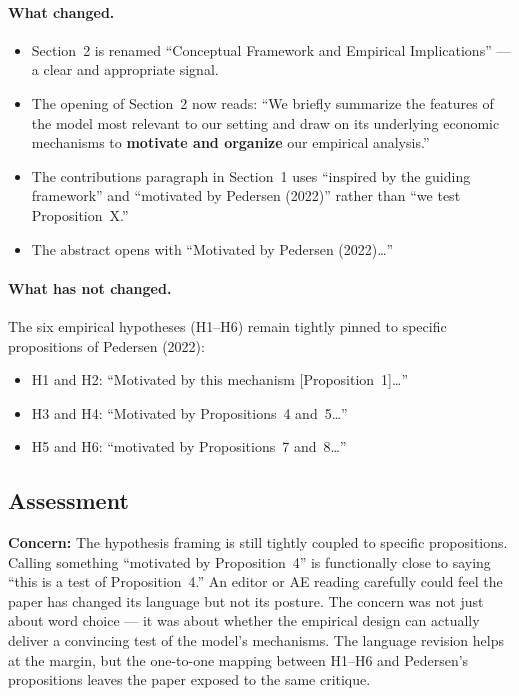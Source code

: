 \documentclass[11pt]{article}
\newcommand{\concern}[1]{\textcolor{concern}{\textbf{Concern:} #1}}
\begin{document}
\paragraph{What changed.}
\begin{itemize}
  \item Section~2 is renamed ``Conceptual Framework and Empirical
    Implications'' --- a clear and appropriate signal.
  \item The opening of Section~2 now reads: ``We briefly summarize the
    features of the model most relevant to our setting and draw on its
    underlying economic mechanisms to \textbf{motivate and organize} our
    empirical analysis.''
  \item The contributions paragraph in Section~1 uses ``inspired by the
    guiding framework'' and ``motivated by Pedersen (2022)'' rather than
    ``we test Proposition~X.''
  \item The abstract opens with ``Motivated by Pedersen (2022)\ldots''
\end{itemize}

\paragraph{What has not changed.}
The six empirical hypotheses (H1--H6) remain tightly pinned to specific
propositions of Pedersen (2022):

\begin{itemize}
  \item H1 and H2: ``Motivated by this mechanism [Proposition~1]\ldots''
  \item H3 and H4: ``Motivated by Propositions~4 and~5\ldots''
  \item H5 and H6: ``motivated by Propositions~7 and~8\ldots''
\end{itemize}

\subsection*{Assessment}

\concern{The hypothesis framing is still tightly coupled to specific
propositions.} Calling something ``motivated by Proposition~4'' is
functionally close to saying ``this is a test of Proposition~4.'' An
editor or AE reading carefully could feel the paper has changed its
language but not its posture. The concern was not just about word choice
--- it was about whether the empirical design can actually deliver a
convincing test of the model's mechanisms. The language revision helps at
the margin, but the one-to-one mapping between H1--H6 and Pedersen's
propositions leaves the paper exposed to the same critique.
\end{document}
